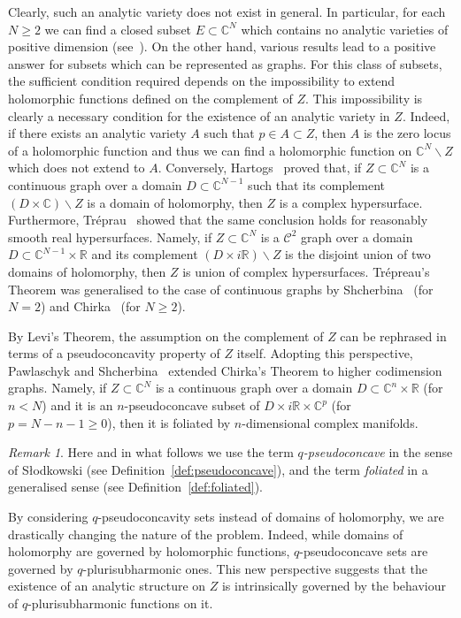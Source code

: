 \documentclass[reqno,oneside]{amsart}
\newcommand{\numberset}{\mathbb}
\newcommand{\R}{\numberset{R}}
\newcommand{\C}{\numberset{C}}
\theoremstyle{definition}
\theoremstyle{plain}
\theoremstyle{remark}
\newtheorem{intrormk}[introdef]{Remark}
\begin{document}
Clearly, such an analytic variety does not exist in general. In particular, for each $N\geq 2$ we can find a closed subset $E\subset\C^N$ which contains no analytic varieties of positive dimension (see~\cite[Theorem~1.1]{har_shch_tom:wermer}). On the other hand, various results lead to a positive answer for subsets which can be represented as graphs. For this class of subsets, the sufficient condition required depends on the impossibility to extend holomorphic functions defined on the complement of $Z$. This impossibility is clearly a necessary condition for the existence of an analytic variety in $Z$. Indeed, if there exists an analytic variety $A$ such that $p\in A\subset Z$, then $A$ is the zero locus of a holomorphic function and thus we can find a holomorphic function on $\C^N\smallsetminus Z$ which does not extend to $A$. Conversely, Hartogs~\cite{hartogs:analytischen} proved that, if $Z\subset\C^N$ is a continuous graph over a domain $D\subset\C^{N-1}$ such that its complement $(D\times\C)\smallsetminus Z$ is a domain of holomorphy, then $Z$ is a complex hypersurface. Furthermore, Tréprau~\cite{trepreau:prolongement} showed that the same conclusion holds for reasonably smooth real hypersurfaces. Namely, if $Z\subset\C^N$ is a $\mathscr{C}^2$ graph over a domain $D\subset\C^{N-1}\times\R$ and its complement $(D\times i\R)\smallsetminus Z$ is the disjoint union of two domains of holomorphy, then $Z$ is union of complex hypersurfaces. Trépreau's Theorem was generalised to the case of continuous graphs by Shcherbina~\cite{shcherbina:polynomial_hull} (for $N=2$) and Chirka~\cite{chirka:trepreau_theorem} (for $N\geq 2$).

By Levi's Theorem, the assumption on the complement of $Z$ can be rephrased in terms of a pseudoconcavity property of $Z$ itself. Adopting this perspective, Pawlaschyk and Shcherbina~\cite{pawl_shcher:foliations} extended Chirka's Theorem to higher codimension graphs. Namely, if $Z\subset\C^N$ is a continuous graph over a domain $D\subset\C^n\times\R$ (for $n<N$) and it is an $n$-pseudoconcave subset of $D\times i\R\times\C^p$ (for $p=N-n-1\geq 0$), then it is foliated by $n$-dimensional complex manifolds.
\begin{intrormk}
	Here and in what follows we use the term \emph{$q$-pseudoconcave} in the sense of Słodkowski (see Definition~\ref{def:pseudoconcave}), and the term \emph{foliated} in a generalised sense (see Definition~\ref{def:foliated}).
\end{intrormk}

By considering $q$-pseudoconcavity sets instead of domains of holomorphy, we are drastically changing the nature of the problem. Indeed, while domains of holomorphy are governed by holomorphic functions, $q$-pseudoconcave sets are governed by $q$-plurisubharmonic ones. This new perspective suggests that the existence of an analytic structure on $Z$ is intrinsically governed by the behaviour of $q$-plurisubharmonic functions on it. 
\end{document}
